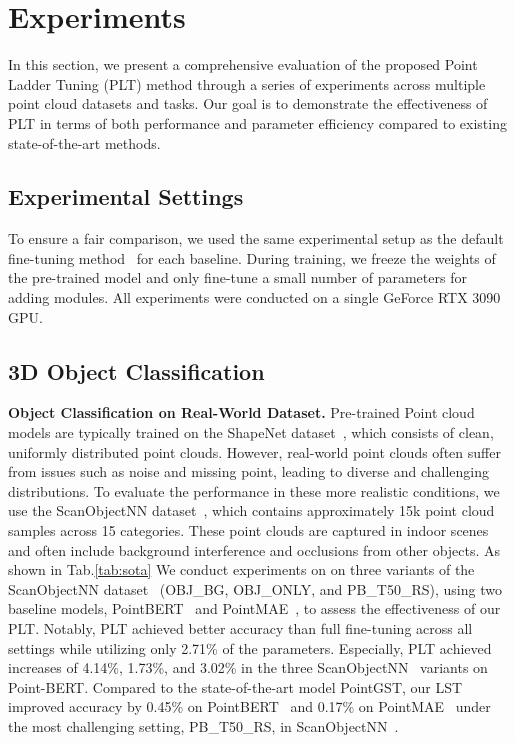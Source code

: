 

\section{Experiments}
\label{sec:experiments}
In this section, we present a comprehensive evaluation of the proposed Point Ladder Tuning (PLT) method through a series of experiments across multiple point cloud datasets and tasks. Our goal is to demonstrate the effectiveness of PLT in terms of both performance and parameter efficiency compared to existing state-of-the-art methods.
\subsection{Experimental Settings}
To ensure a fair comparison, we used the same experimental setup as the default fine-tuning method~\cite{zha2023instance, zhou2024dynamic} for each baseline. During training, we freeze the weights of the pre-trained model and only fine-tune a small number of parameters for adding modules. All experiments were conducted on a single GeForce RTX 3090 GPU.

\subsection{3D Object Classification}
\label{sec:classification}
\textbf{Object Classification on Real-World Dataset.} Pre-trained Point cloud models are typically trained on the ShapeNet dataset~\cite{chang2015shapenet}, which consists of clean, uniformly distributed point clouds. However, real-world point clouds often suffer from issues such as noise and missing point, leading to diverse and challenging distributions. To evaluate the performance in these more realistic conditions, we use the ScanObjectNN dataset~\cite{uy2019revisiting}, which contains approximately 15k point cloud samples across 15 categories. These point clouds are captured in indoor scenes and often include background interference and occlusions from other objects. As shown in Tab.\ref{tab:sota} We conduct experiments on on three variants of the ScanObjectNN dataset~\cite{uy2019revisiting} (OBJ\_BG, OBJ\_ONLY, and PB\_T50\_RS), using two baseline models, PointBERT~\cite{yu2022point} and PointMAE~\cite{pang2022masked}, to assess the effectiveness of our PLT. Notably, PLT achieved better accuracy than full fine-tuning across all settings while utilizing only 2.71\% of the parameters. Especially, PLT achieved increases of 4.14\%, 1.73\%, and 3.02\% in the three ScanObjectNN~\cite{uy2019revisiting} variants on Point-BERT. Compared to the state-of-the-art model PointGST, our LST improved accuracy by 0.45\% on PointBERT~\cite{yu2022point} and 0.17\% on PointMAE~\cite{pang2022masked} under the most challenging setting, PB\_T50\_RS, in ScanObjectNN~\cite{uy2019revisiting}.


